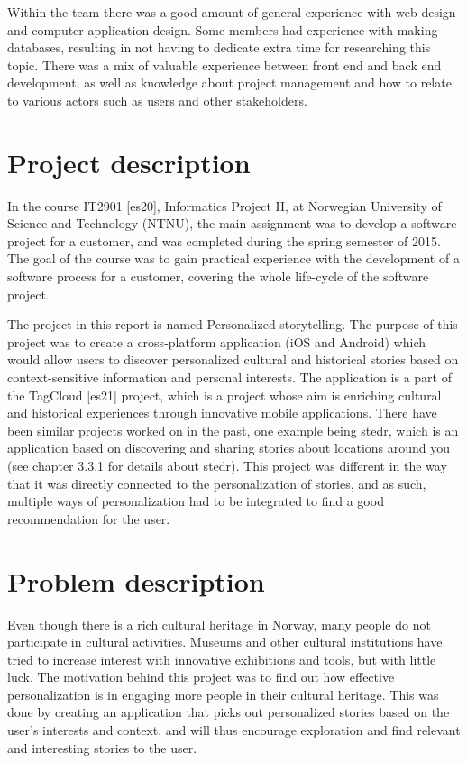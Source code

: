 Within the team there was a good amount of general experience with web design and computer application design. Some members had experience with making databases, resulting in not having to dedicate extra time for researching this topic. There was a mix of valuable experience between front end and back end development, as well as knowledge about project management and how to relate to various actors such as users and other stakeholders.

\section{Project description}

In the course IT2901 [es20], Informatics Project II, at Norwegian University of Science and Technology (NTNU), the main assignment was to develop a software project for a customer, and was completed during the spring semester of 2015. The goal of the course was to gain practical experience with the development of a software process for a customer, covering the whole life-cycle of the software project.

The project in this report is named Personalized storytelling. The purpose of this project was to create a cross-platform application (iOS and Android) which would allow users to discover personalized cultural and historical stories based on context-sensitive information and personal interests. The application is a part of the TagCloud [es21] project, which is a project whose aim is enriching cultural and historical experiences through innovative mobile applications.
There have been similar projects worked on in the past, one example being stedr, which is an application based on discovering and sharing stories about  locations around you (see chapter 3.3.1 for details about stedr). This project was different in the way that it was directly connected to the personalization of stories, and as such, multiple ways of personalization had to be integrated to find a good recommendation for the user.

\section{Problem description}

Even though there is a rich cultural heritage in Norway, many people do not participate in cultural activities. Museums and other cultural institutions have tried to increase interest with innovative exhibitions and tools, but with little luck. The motivation behind this project was to find out how effective personalization is in engaging more people in their cultural heritage. This was done by creating an application that picks out personalized stories based on the user's interests and context, and will thus encourage exploration and find relevant and interesting stories to the user. 

